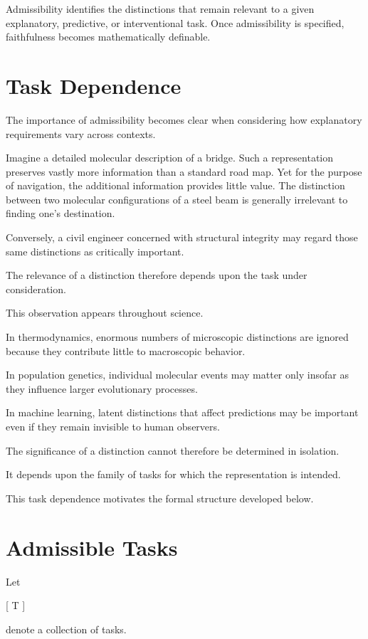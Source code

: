 \documentclass[11pt,oneside,openany]{book}
\begin{document}
Admissibility identifies the distinctions that remain relevant to a given explanatory, predictive, or interventional task. Once admissibility is specified, faithfulness becomes mathematically definable.

\section{Task Dependence}

The importance of admissibility becomes clear when considering how explanatory requirements vary across contexts.

Imagine a detailed molecular description of a bridge. Such a representation preserves vastly more information than a standard road map. Yet for the purpose of navigation, the additional information provides little value. The distinction between two molecular configurations of a steel beam is generally irrelevant to finding one's destination.

Conversely, a civil engineer concerned with structural integrity may regard those same distinctions as critically important.

The relevance of a distinction therefore depends upon the task under consideration.

This observation appears throughout science.

In thermodynamics, enormous numbers of microscopic distinctions are ignored because they contribute little to macroscopic behavior.

In population genetics, individual molecular events may matter only insofar as they influence larger evolutionary processes.

In machine learning, latent distinctions that affect predictions may be important even if they remain invisible to human observers.

The significance of a distinction cannot therefore be determined in isolation.

It depends upon the family of tasks for which the representation is intended.

This task dependence motivates the formal structure developed below.

\section{Admissible Tasks}

Let

[
\mathcal T
]

denote a collection of tasks.
\end{document}
